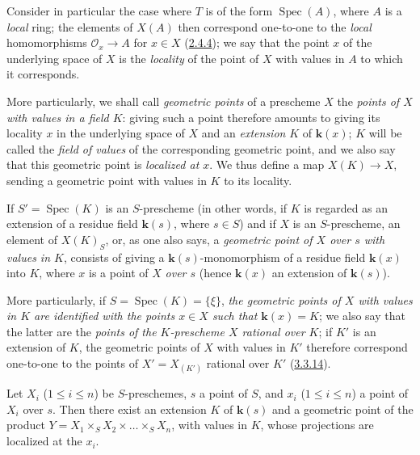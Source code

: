 \begin{env}[3.4.5]
\label{I.3.4.5}
Consider in particular the case where $T$ is of the form
$\operatorname{Spec}(A)$, where $A$ is a \emph{local} ring; the elements of
$X(A)$ then correspond one-to-one to the \emph{local} homomorphisms
$\mathcal{O}_x\to A$ for $x\in X$ (\hyperref[I.2.4.4]{2.4.4}); we say that
the point $x$ of the underlying space of $X$ is the \emph{locality} of the point
of $X$ with values in $A$ to which it corresponds.

More particularly, we shall call \emph{geometric points} of a prescheme
$X$ the \emph{points of $X$ with values in a field $K$}: giving such a
point therefore amounts to giving its
locality $x$ in the underlying space of $X$ and an \emph{extension} $K$ of
$\boldsymbol{k}(x)$; $K$ will be called the \emph{field of values} of the corresponding
geometric point, and we also say that this geometric point is \emph{localized
at $x$}. We thus define a map $X(K)\to X$, sending a geometric point with
values in $K$ to its locality.

If $S'=\operatorname{Spec}(K)$ is an $S$-prescheme (in other words, if $K$ is
regarded as an extension of a residue field $\boldsymbol{k}(s)$, where $s\in S$) and if $X$
is an $S$-prescheme, an element of $X(K)_S$, or, as one also says, a
\emph{geometric point of $X$ over $s$ with values in $K$}, consists
of giving a $\boldsymbol{k}(s)$-monomorphism of a residue field $\boldsymbol{k}(x)$ into $K$, where
$x$ is a point of $X$ \emph{over $s$} (hence $\boldsymbol{k}(x)$ an extension of
$\boldsymbol{k}(s)$).

More particularly, if $S=\operatorname{Spec}(K)=\{\xi\}$, \emph{the geometric
points of $X$ with values in $K$ are identified with the points $x\in X$ such
that $\boldsymbol{k}(x)=K$}; we also say that the latter are the \emph{points of the
$K$-prescheme $X$ rational over $K$}; if $K'$ is an extension of $K$, the
geometric points of $X$ with values in $K'$ therefore correspond
one-to-one to the points of $X'=X_{(K')}$ rational over $K'$
(\hyperref[I.3.3.14]{3.3.14}).
\end{env}

\begin{lemma}[3.4.6]
\label{I.3.4.6}
Let $X_i$ ($1\leq i\leq n$) be $S$-preschemes, $s$ a point of $S$, and $x_i$
($1\leq i\leq n$) a point of $X_i$ over $s$. Then there exist an
extension $K$ of $\boldsymbol{k}(s)$ and a geometric point of the product
$Y=X_1\times_S X_2\times\ldots\times_S X_n$, with values in $K$, whose
projections are localized at the $x_i$.
\end{lemma}

